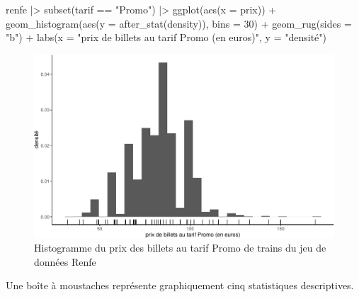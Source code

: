 \documentclass[
  11pt,
  letterpaper,
]{book}
\newenvironment{Shaded}{\begin{snugshade}}{\end{snugshade}}
\newcommand{\AttributeTok}[1]{\textcolor[rgb]{0.40,0.45,0.13}{#1}}
\newcommand{\DecValTok}[1]{\textcolor[rgb]{0.68,0.00,0.00}{#1}}
\newcommand{\FunctionTok}[1]{\textcolor[rgb]{0.28,0.35,0.67}{#1}}
\newcommand{\NormalTok}[1]{\textcolor[rgb]{0.00,0.23,0.31}{#1}}
\newcommand{\SpecialCharTok}[1]{\textcolor[rgb]{0.37,0.37,0.37}{#1}}
\newcommand{\StringTok}[1]{\textcolor[rgb]{0.13,0.47,0.30}{#1}}
\theoremstyle{definition}
\theoremstyle{remark}
\begin{document}
\begin{Shaded}
\begin{Highlighting}[]
\NormalTok{renfe }\SpecialCharTok{|\textgreater{}}
  \FunctionTok{subset}\NormalTok{(tarif }\SpecialCharTok{==} \StringTok{"Promo"}\NormalTok{) }\SpecialCharTok{|\textgreater{}}
  \FunctionTok{ggplot}\NormalTok{(}\FunctionTok{aes}\NormalTok{(}\AttributeTok{x =}\NormalTok{ prix)) }\SpecialCharTok{+} 
    \FunctionTok{geom\_histogram}\NormalTok{(}\FunctionTok{aes}\NormalTok{(}\AttributeTok{y =} \FunctionTok{after\_stat}\NormalTok{(density)), }
                   \AttributeTok{bins =} \DecValTok{30}\NormalTok{) }\SpecialCharTok{+}
    \FunctionTok{geom\_rug}\NormalTok{(}\AttributeTok{sides =} \StringTok{"b"}\NormalTok{) }\SpecialCharTok{+} 
    \FunctionTok{labs}\NormalTok{(}\AttributeTok{x =} \StringTok{"prix de billets au tarif Promo (en euros)"}\NormalTok{, }
         \AttributeTok{y =} \StringTok{"densité"}\NormalTok{) }
\end{Highlighting}
\end{Shaded}

\begin{figure}[ht!]

{\centering \includegraphics[width=1\textwidth,height=\textheight]{./01-analyseexploratoire_files/figure-pdf/fig-histrenfe-1.pdf}

}

\caption{\label{fig-histrenfe}Histogramme du prix des billets au tarif
Promo de trains du jeu de données Renfe}

\end{figure}

Une boîte à moustaches représente graphiquement cinq statistiques
descriptives.
\end{document}
